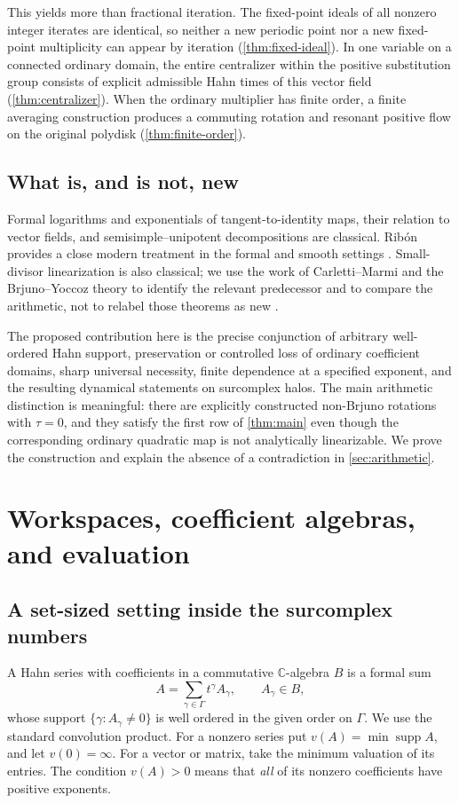 \documentclass[11pt,letterpaper]{article}
\theoremstyle{definition}
\theoremstyle{remark}
\newcommand{\C}{\mathbb C}
\newcommand{\supp}{\operatorname{supp}}
\numberwithin{equation}{section}
\begin{document}
This yields more than fractional iteration. The fixed-point ideals of all
nonzero integer iterates are identical, so neither a new periodic point nor
a new fixed-point multiplicity can appear by iteration
(\cref{thm:fixed-ideal}). In one variable on a connected ordinary domain, the
entire centralizer within the positive substitution group consists of
explicit admissible Hahn times of this vector field
(\cref{thm:centralizer}). When the ordinary multiplier has finite order, a
finite averaging construction produces a commuting rotation and resonant
positive flow on the original polydisk (\cref{thm:finite-order}).

\subsection{What is, and is not, new}
Formal logarithms and exponentials of tangent-to-identity maps, their
relation to vector fields, and semisimple--unipotent decompositions are
classical. Rib\'on provides a close modern treatment in the formal and smooth
settings \cite{Ribon}. Small-divisor linearization is also classical; we use
the work of Carletti--Marmi and the Brjuno--Yoccoz theory to identify the
relevant predecessor and to compare the arithmetic, not to relabel those
theorems as new \cite{CarlettiMarmi,Yoccoz,BuffCheritat}.

The proposed contribution here is the precise conjunction of arbitrary
well-ordered Hahn support, preservation or controlled loss of ordinary
coefficient domains, sharp universal necessity, finite dependence at a
specified exponent, and the resulting dynamical statements on surcomplex
halos. The main arithmetic distinction is meaningful: there are explicitly
constructed non-Brjuno rotations with $\tau=0$, and they satisfy the first
row of \cref{thm:main} even though the corresponding ordinary quadratic map
is not analytically linearizable. We prove the construction and explain the
absence of a contradiction in \cref{sec:arithmetic}.

\section{Workspaces, coefficient algebras, and evaluation}\label{sec:framework}

\subsection{A set-sized setting inside the surcomplex numbers}
A Hahn series with coefficients in a commutative $\C$-algebra $B$ is a formal
sum
\[
 A=\sum_{\gamma\in\Gamma}t^\gamma A_\gamma,
 \qquad A_\gamma\in B,
\]
whose support $\{\gamma:A_\gamma\ne0\}$ is well ordered in the given order
on $\Gamma$. We use the standard convolution product. For a nonzero series
put $v(A)=\min\supp A$, and let $v(0)=\infty$. For a vector or matrix, take
the minimum valuation of its entries. The condition $v(A)>0$ means that
\emph{all} of its nonzero coefficients have positive exponents.
\end{document}
